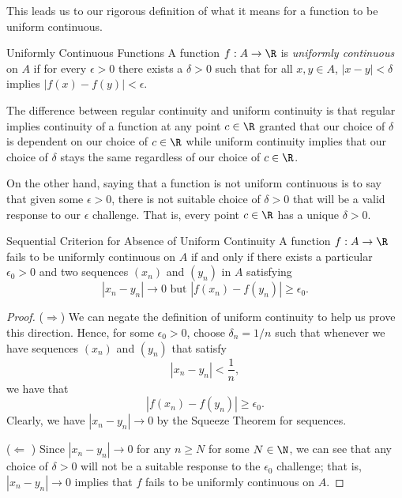 This leads us to our rigorous definition of what it means for a function to be uniform continuous.

\begin{definition}{Uniformly Continuous Functions}{}
A function \( f: A \to \R  \) is \textit{uniformly continuous} on \( A  \) if for every \( \epsilon > 0  \) there exists a \( \delta > 0  \) such that for all \( x,y \in A  \), \( | x - y  | < \delta  \) implies \( | f(x) - f(y) | < \epsilon. \)
\end{definition}

The difference between regular continuity and uniform continuity is that regular implies continuity of a function at any point \( c \in \R  \) granted that our choice of \( \delta  \) is dependent on our choice of \( c \in \R  \) while uniform continuity implies that our choice of \( \delta  \) stays the same regardless of our choice of \( c \in \R  \).

On the other hand, saying that a function is not uniform continuous is to say that given some \( \epsilon > 0  \), there is not suitable choice of \( \delta > 0  \) that will be a valid response to our \( \epsilon  \) challenge. That is, every point \( c \in \R  \) has a unique \( \delta > 0   \).   

\begin{theorem}{Sequential Criterion for Absence of Uniform Continuity}{}
    A function \( f: A \to \R  \) fails to be uniformly continuous on \( A  \) if and only if there exists a particular \( \epsilon_0 > 0  \) and two sequences \( (x_n) \) and \( (y_n) \) in \( A  \) satisfying 
    \[ | x_n - y_n  | \to 0 \text{~but~} | f(x_n) - f(y_n) | \geq \epsilon_0. \]
    \end{theorem}

\begin{proof}
    (\( \Rightarrow \)) We can negate the definition of uniform continuity to help us prove this direction. Hence, for some \( \epsilon_0 > 0  \), choose \( \delta_n = 1/n  \) such that whenever we have  sequences \( (x_n) \) and \( (y_n) \) that satisfy
    \[ | x_n - y_n  | < \frac{ 1 }{ n }, \]
we have that 
\[ | f(x_n) - f(y_n) | \geq \epsilon_0. \]
Clearly, we have \( | x_n - y_n | \to 0  \) by the Squeeze Theorem for sequences.

(\( \Leftarrow \) ) Since \( | x_n - y_n | \to 0  \) for any \( n \geq N   \) for some \( N \in \N  \), we can see that any choice of \( \delta > 0  \) will not be a suitable response to the \( \epsilon_0  \) challenge; that is, \( | x_n - y_n | \to 0  \) implies that \( f  \) fails to be uniformly continuous on \( A  \). 
\end{proof}


